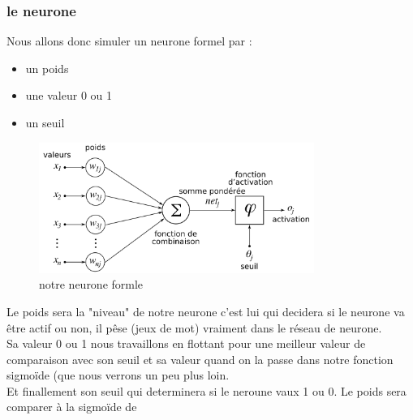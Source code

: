 \subsubsection{le neurone}
Nous allons donc simuler un neurone formel par : 
\begin{itemize}
\item un poids 
\item une valeur 0 ou 1 
\item un seuil
\end{itemize}
\begin{figure}[h]
  \center
  \includegraphics[width=0.80\textwidth]{neuroneformle.png}
  \caption{notre neurone formle}
\end{figure}
Le poids sera la "niveau" de notre neurone c'est lui qui decidera si le neurone va être actif ou non, il pêse (jeux de mot) vraiment dans le réseau de neurone.\\
Sa valeur 0 ou 1 nous travaillons en flottant pour une meilleur valeur de comparaison avec son seuil et sa valeur quand on la passe dans notre fonction sigmoïde (que nous verrons un peu plus loin.\\
Et finallement son seuil qui determinera si le neroune vaux 1 ou 0. Le poids sera comparer à la sigmoïde de 
